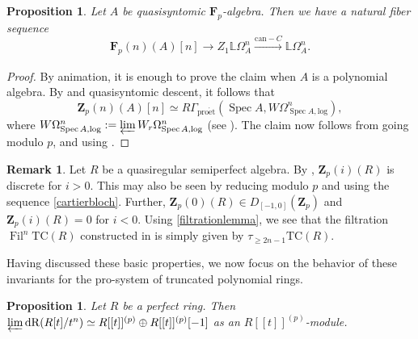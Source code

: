 \documentclass[10pt,letterpaper]{amsart}
\numberwithin{figure}{section}
\numberwithin{equation}{section}
\newtheorem{proposition}[figure]{Proposition}
\theoremstyle{definition}
\theoremstyle{definition}
\newtheorem{remark}[figure]{Remark}
\theoremstyle{definition}
\theoremstyle{definition}
\DeclareMathOperator{\Spec}{Spec}
\DeclareMathOperator{\Fil}{Fil}
\newcommand{\LL}{\L}
\newcommand{\TC}{\mathrm{TC}}
\renewcommand{\L}{\mathbb{L}}
\newcommand{\Z}{\mathbf{Z}}
\newcommand{\F}{\mathbf{F}}
\begin{document}
\begin{proposition} Let $A$ be quasisyntomic $\F_p$-algebra. Then we have a natural fiber sequence
    \begin{equation}\label{cartierbloch}
    \F_p(n)(A)[n] \to Z_1 \LL \Omega^n_A \xrightarrow[]{\mathrm{can} - C} \LL\Omega^n_A.
\end{equation}
\end{proposition}{}

\begin{proof}
By animation, it is enough to prove the claim when $A$ is a polynomial algebra. By \cite[Prop.~8.21]{BMS2} and quasisyntomic descent, it follows that $$\Z_p (n)(A)[n] \simeq R\Gamma_{\mathrm{pro\acute{e}t}}(\Spec A, W\Omega^n_{\Spec A, \mathrm{log}}),$$ where $W\Omega^n_{\Spec A, \mathrm{log}} := \varprojlim W_r\Omega^n_{\Spec A, \mathrm{log}}$ (see \cite[Prop.~8.4]{BMS2}). The claim now follows from going modulo $p$, and using \cite[2.1.20,~2.4.1.1,~Thm.~2.4.2,~Cor.~5.7.5]{Luc1}.
\end{proof}{}


\begin{remark}\label{BMSsimple}
   Let $R$ be a quasiregular semiperfect algebra. By \cite[Lem.~8.19]{BMS2}, $\Z_p(i) (R)$ is discrete for $i>0.$ This may also be seen by reducing modulo $p$ and using the sequence \cref{cartierbloch}. Further, $\Z_p (0)(R) \in D_{[-1,0]}(\Z_p)$ and $\Z_p (i) (R) = 0$ for $i<0.$ Using \cref{filtrationlemma}, we see that the filtration $\Fil^n\TC(R)$ constructed in \cite{BMS2} is simply given by $\tau_{\ge 2n-1} \TC(R).$ 
\end{remark}{}








Having discussed these basic properties, we now focus on the behavior of these invariants for the pro-system of truncated polynomial rings.

\begin{proposition}\label{ven}
    Let $R$ be a perfect ring. Then $\varprojlim \mathrm{dR}(R[t]/t^n) \simeq R[[t]]^{(p)} \oplus R[[t]]^{(p)}[-1]$ as an $R[[t]]^{(p)}$-module.
\end{proposition}{}
\end{document}
